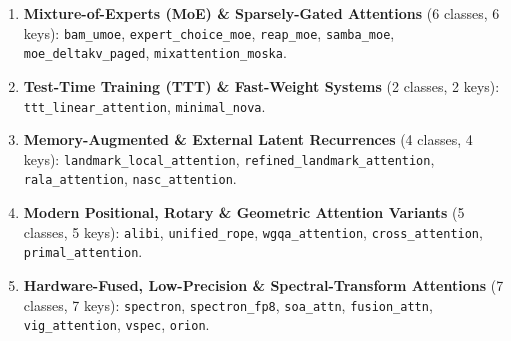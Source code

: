 \documentclass{article}
\begin{document}
\begin{enumerate}
    \item \textbf{Mixture-of-Experts (MoE) \& Sparsely-Gated Attentions} (6 classes, 6 keys): \texttt{bam\_umoe}, \texttt{expert\_choice\_moe}, \texttt{reap\_moe}, \texttt{samba\_moe}, \texttt{moe\_deltakv\_paged}, \texttt{mixattention\_moska}.
    \item \textbf{Test-Time Training (TTT) \& Fast-Weight Systems} (2 classes, 2 keys): \texttt{ttt\_linear\_attention}, \texttt{minimal\_nova}.
    \item \textbf{Memory-Augmented \& External Latent Recurrences} (4 classes, 4 keys): \texttt{landmark\_local\_attention}, \texttt{refined\_landmark\_attention}, \texttt{rala\_attention}, \texttt{nasc\_attention}.
    \item \textbf{Modern Positional, Rotary \& Geometric Attention Variants} (5 classes, 5 keys): \texttt{alibi}, \texttt{unified\_rope}, \texttt{wgqa\_attention}, \texttt{cross\_attention}, \texttt{primal\_attention}.
    \item \textbf{Hardware-Fused, Low-Precision \& Spectral-Transform Attentions} (7 classes, 7 keys): \texttt{spectron}, \texttt{spectron\_fp8}, \texttt{soa\_attn}, \texttt{fusion\_attn}, \texttt{vig\_attention}, \texttt{vspec}, \texttt{orion}.
\end{enumerate}
\end{document}
